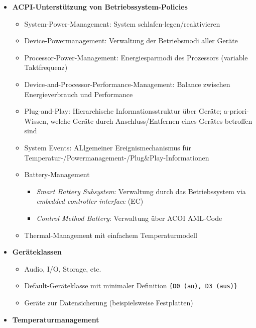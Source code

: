 \begin{itemize}
	\item \textbf{ACPI-Unterstützung von Betriebssystem-Policies}
	\begin{itemize}
		\item System-Power-Management: System schlafen-legen/reaktivieren
		\item Device-Powermanagement: Verwaltung der Betriebsmodi aller Geräte
		\item Processor-Power-Management: Energiesparmodi des Prozessors (variable Taktfrequenz)
		\item Device-and-Processor-Performance-Management: Balance zwischen Energieverbrauch und Performance
		\item Plug-and-Play: Hierarchische Informationsstruktur über Geräte; a-priori-Wissen, welche Geräte durch Anschluss/Entfernen eines Gerätes betroffen sind
		\item System Events: ALlgemeiner Ereignismechanismus für Temperatur-/Powermanagement-/Plug\&Play-Informationen
		\item Battery-Management
		\begin{itemize}
			\item \textit{Smart Battery Subsystem}: Verwaltung durch das Betriebssystem via \textit{embedded controller interface} (EC)
			\item \textit{Control Method Battery}: Verwaltung über ACOI AML-Code
		\end{itemize}
		\item Thermal-Management mit einfachem Temperaturmodell
	\end{itemize}
	\item \textbf{Geräteklassen}
	\begin{itemize}
		\item Audio, I/O, Storage, etc.
		\item Default-Geräteklasse mit minimaler Definition \texttt{\big\{D0 (an), D3 (aus)\big\}}
		\item Geräte zur Datensicherung (beispielsweise Festplatten)
	\end{itemize}
	\item \textbf{Temperaturmanagement}

\end{itemize}
